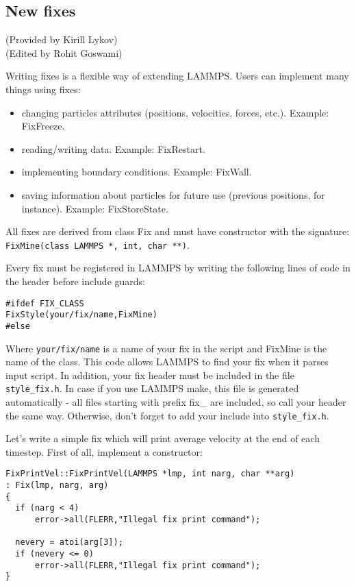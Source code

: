 \documentclass{article}
\newcommand{\path}[1]{{\color{gray}\texttt{#1}}}
\begin{document}
\subsection{New fixes}

(Provided by Kirill Lykov)\\
(Edited by Rohit Goswami)
\vspace{0.25cm}

Writing fixes is a flexible way of extending LAMMPS. Users can
implement many things using fixes:

\begin{itemize}
\item changing particles attributes (positions, velocities, forces, etc.).
Example: FixFreeze.
\item reading/writing data. Example: FixRestart.
\item implementing boundary conditions. Example: FixWall.
\item saving information about particles for future use (previous positions,
for instance). Example: FixStoreState.
\end{itemize}

All fixes are derived from class Fix and must have constructor with the
signature: \texttt{FixMine(class LAMMPS *, int, char **)}.

Every fix must be registered in LAMMPS by writing the following lines
of code in the header before include guards:

 \begin{center}
 \begin{verbatim}
#ifdef FIX_CLASS
FixStyle(your/fix/name,FixMine)
#else
  \end{verbatim}
 \end{center}

Where \path{your/fix/name} is a name of your fix in the script and FixMine
is the name of the class. This code allows LAMMPS to find your fix
when it parses input script. In addition, your fix header must be
included in the file \path{style\_fix.h}. In case if you use LAMMPS make,
this file is generated automatically - all files starting with prefix
fix\_ are included, so call your header the same way. Otherwise, don't
forget to add your include into \path{style\_fix.h}.

Let's write a simple fix which will print average velocity at the end
of each timestep. First of all, implement a constructor:

 \begin{center}
 \begin{verbatim}
FixPrintVel::FixPrintVel(LAMMPS *lmp, int narg, char **arg)
: Fix(lmp, narg, arg)
{
  if (narg < 4)
      error->all(FLERR,"Illegal fix print command");

  nevery = atoi(arg[3]);
  if (nevery <= 0)
      error->all(FLERR,"Illegal fix print command");
}
  \end{verbatim}
 \end{center}
\end{document}

